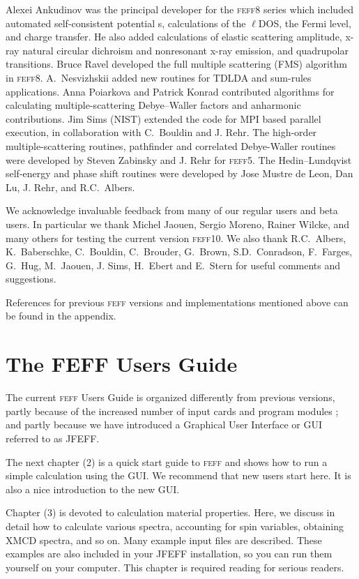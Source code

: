 \documentclass[11pt,oneside]{report} %
\renewcommand{\htmlref}[2]{\hyperlink{#2}{#1}}
\newcommand{\program}[1]{\textsc{#1}}
\newcommand{\feff}{\program{feff}}
\newcommand{\vnum}{10}
\newcommand{\feffcur}{\feff\vnum}
\renewcommand{\htmlref}[2]{{#1}} %
\begin{document}
\begin{latexonly}
Alexei Ankudinov was the principal developer for
the {\feff}8 series which included automated self-consistent potential
s, calculations of the $\ell$DOS, the Fermi level, and charge transfer.
He also added calculations of elastic scattering
amplitude, x-ray natural circular dichroism and nonresonant x-ray
emission, and quadrupolar transitions.  Bruce Ravel developed the full
multiple scattering (FMS) algorithm in {\feff}8. 
A.\ Nesvizhskii added new routines for TDLDA and sum-rules
applications. Anna Poiarkova and Patrick Konrad
contributed algorithms for calculating multiple-scattering Debye--Waller
factors and anharmonic contributions. Jim Sims (NIST) extended the code for
MPI based parallel execution, in collaboration with C.\ Bouldin and
J. Rehr.  The high-order multiple-scattering routines, pathfinder and
correlated Debye-Waller routines were developed by Steven Zabinsky and
J. Rehr for {\feff}5.
The Hedin--Lundqvist self-energy and phase shift routines were developed
by Jose Mustre de Leon, Dan Lu, J. Rehr, and R.C.~Albers.

We acknowledge invaluable feedback from many of our regular users and beta users.  In particular we thank Michel Jaouen, Sergio Moreno, Rainer Wilcke, and many others for testing the current version {\feffcur}.  We also thank R.C.\
Albers, K.\ Baberschke, C.\ Bouldin, C.\ Brouder, G.\ Brown,
S.D.\ Conradson, F.\ Farges, G.\ Hug, M.\ Jaouen, J. Sims, H.\ Ebert and
E.\ Stern for useful comments and suggestions.

References for previous {\feff} versions and implementations mentioned above can be found in the appendix.



\newpage
\section{The FEFF Users Guide}
\label{sec:UG}

The current {\feff} Users Guide is organized differently from previous versions, partly because of
the increased number of input cards and program modules ; and partly because
we have introduced a Graphical User Interface or GUI referred to as JFEFF.

The next chapter (2) is a \htmlref{quick start guide}{sec:tutorial} to {\feff} and shows how to run a simple calculation
using the GUI.  We recommend that new users start here.  It is also a nice introduction to the new GUI.

Chapter (3) is devoted to \htmlref{calculation material properties}{sec:Calc-Strat-Exampl}.  Here, we discuss in detail how to calculate various spectra, accounting for spin variables, obtaining XMCD spectra, and so on.  Many example input files are described.  These examples are also included in your JFEFF installation, so you can run them yourself on your computer.  This chapter is required reading for serious readers.


\end{latexonly}
\end{document}
